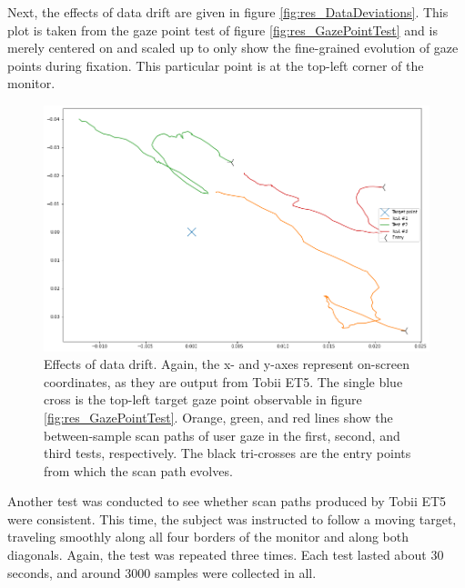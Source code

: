 Next, the effects of data drift are given in figure \ref{fig:res_DataDeviations}. This plot is taken from the gaze point test of figure \ref{fig:res_GazePointTest} and is merely centered on and scaled up to only show the fine-grained evolution of gaze points during fixation. This particular point is at the top-left corner of the monitor. 

\begin{figure}[h]
    \centering
    \includegraphics[width=\textwidth]{Images/DataQuality/DataDrift.png}
    \caption{Effects of data drift. Again, the x- and y-axes represent on-screen coordinates, as they are output from Tobii ET5. The single blue cross is the top-left target gaze point observable in figure \ref{fig:res_GazePointTest}. Orange, green, and red lines show the between-sample scan paths of user gaze in the first, second, and third tests, respectively. The black tri-crosses are the entry points from which the scan path evolves.}
    \label{fig:res_DataDrift}
\end{figure}

Another test was conducted to see whether scan paths produced by Tobii ET5 were consistent. This time, the subject was instructed to follow a moving target, traveling smoothly along all four borders of the monitor and along both diagonals. Again, the test was repeated three times. Each test lasted about 30 seconds, and around 3000 samples were collected in all.

